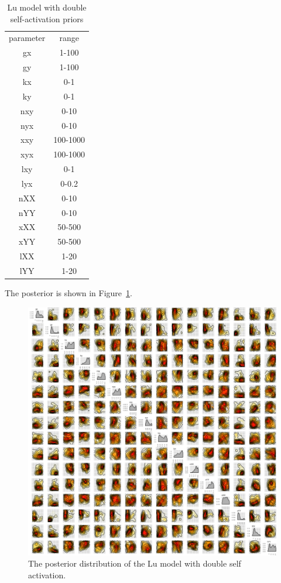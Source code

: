 \begin{table}[htbp]
\centering
\caption{Lu model with double self-activation priors}
\label{tab:lu_dp_pr}
\begin{tabular}{cc}
parameter & range \\
gx & 1-100 \\
gy & 1-100 \\
kx & 0-1 \\
ky & 0-1 \\
nxy & 0-10 \\
nyx & 0-10 \\
xxy & 100-1000 \\
xyx & 100-1000 \\
lxy & 0-1 \\
lyx & 0-0.2 \\
nXX & 0-10  \\
nYY & 0-10 \\
xXX & 50-500 \\
xYY & 50-500 \\
lXX & 1-20 \\
lYY & 1-20
\end{tabular}
\end{table}

The posterior is shown in Figure~\ref{fig:lu_tristable}. 
\begin{figure}[h]
\centering
\includegraphics[scale=0.4]{chapterModelling/Lu_switches/images/double_pos/posterior_tri_wide_params.png}
\caption[The posterior distribution of the Lu model with double self activation]{The posterior distribution of the Lu model with double self activation.}
\label{fig:lu_tristable}
\end{figure}


